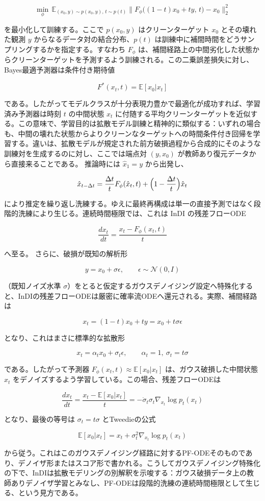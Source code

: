 \[
\min_\phi\,\mathbb{E}_{(x_0,y)\sim p(x_0,y),\,t\sim p(t)}\bigl\|F_\phi\bigl((1-t)x_0+ty,\,t\bigr)-x_0\bigr\|_2^2
\]


を最小化して訓練する。ここで $p(x_0,y)$ はクリーンターゲット $x_0$ とその壊れた観測 $y$ からなるデータ対の結合分布、$p(t)$ は訓練中に補間時間をどうサンプリングするかを指定する。すなわち $F_\phi$ は、補間経路上の中間劣化した状態からクリーンターゲットを予測するよう訓練される。この二乗誤差損失に対し、Bayes最適予測器は条件付き期待値

\[
F^*(x_t,t)=\mathbb{E}[x_0|x_t]
\]


である。したがってモデルクラスが十分表現力豊かで最適化が成功すれば、学習済み予測器は時刻 $t$ の中間状態 $x_t$ に付随する平均クリーンターゲットを近似する。この意味で、学習目的は拡散モデル訓練と精神的に類似する：いずれの場合も、中間の壊れた状態からよりクリーンなターゲットへの時間条件付き回帰を学習する。違いは、拡散モデルが規定された前方破損過程から合成的にそのような訓練対を生成するのに対し、ここでは端点対 $(y,x_0)$ が教師あり復元データから直接来ることである。
推論時には $\hat{x}_1=y$ から出発し、

\[
\hat{x}_{t-\Delta t}=\frac{\Delta t}{t}F_\phi(\hat{x}_t,t)+\Bigl(1-\frac{\Delta t}{t}\Bigr)\hat{x}_t
\]


により推定を繰り返し洗練する。ゆえに最終再構成は単一の直接予測ではなく段階的洗練により生じる。連続時間極限では、これは InDI の残差フローODE

\[
\frac{dx_t}{dt}=\frac{x_t-F_\phi(x_t,t)}{t}
\]


へ至る。
さらに、破損が既知の解析形

\[
y=x_0+\sigma\epsilon,\qquad\epsilon\sim\mathcal{N}(0,I)
\]


（既知ノイズ水準 $\sigma$）をとると仮定するガウスデノイジング設定へ特殊化すると、InDIの残差フローODEは厳密に確率流ODEへ還元される。実際、補間経路は

\[
x_t=(1-t)x_0+ty=x_0+t\sigma\epsilon
\]


となり、これはまさに標準的な拡散形

\[
x_t=\alpha_t x_0+\sigma_t\epsilon,\qquad\alpha_t=1,\ \sigma_t=t\sigma
\]


である。したがって予測器 $F_\phi(x_t,t)\approx\mathbb{E}[x_0|x_t]$ は、ガウス破損した中間状態 $x_t$ をデノイズするよう学習している。この場合、残差フローODEは

\[
\frac{dx_t}{dt}=\frac{x_t-\mathbb{E}[x_0|x_t]}{t}=-\dot{\sigma}_t\sigma_t\nabla_{x_t}\log p_t(x_t)
\]


となり、最後の等号は $\sigma_t=t\sigma$ とTweedieの公式

\[
\mathbb{E}[x_0|x_t]=x_t+\sigma_t^2\nabla_{x_t}\log p_t(x_t)
\]


から従う。これはこのガウスデノイジング経路に対するPF-ODEそのものであり、デノイザ形またはスコア形で書かれる。こうしてガウスデノイジング特殊化の下で、InDIは拡散モデリングの別解釈を示唆する：ガウス破損データ上の教師ありデノイザ学習とみなし、PF-ODEは段階的洗練の連続時間極限として生じる、という見方である。

